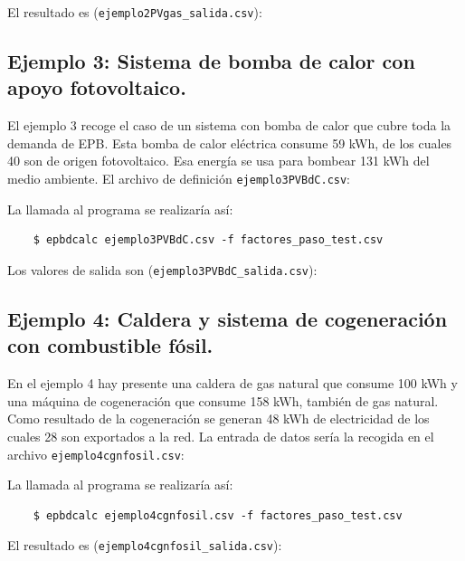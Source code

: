\documentclass[10pt,notitlepage,oneside,a4paper]{article}
\begin{document}
El resultado es (\texttt{ejemplo2PVgas\_salida.csv}):


\subsection{Ejemplo 3: Sistema de bomba de calor con apoyo fotovoltaico.}
El ejemplo 3 recoge el caso de un sistema con bomba de calor que cubre toda la demanda de EPB. Esta bomba de calor eléctrica consume 59 kWh, de los cuales 40 son de origen fotovoltaico. Esa energía se usa para bombear 131 kWh del medio ambiente. El archivo de definición \texttt{ejemplo3PVBdC.csv}:


La llamada al programa se realizaría así:

\begin{verbatim}
    $ epbdcalc ejemplo3PVBdC.csv -f factores_paso_test.csv
\end{verbatim}

Los valores de salida son (\texttt{ejemplo3PVBdC\_salida.csv}):


\subsection{Ejemplo 4: Caldera y sistema de cogeneración con combustible fósil.}
En el ejemplo 4 hay presente una caldera de gas natural que consume 100 kWh y una máquina de cogeneración que consume 158 kWh, también de gas natural. Como resultado de la cogeneración se generan 48 kWh de electricidad de los cuales 28 son exportados a la red. La entrada de datos sería la recogida en el archivo \texttt{ejemplo4cgnfosil.csv}:


La llamada al programa se realizaría así:

\begin{verbatim}
    $ epbdcalc ejemplo4cgnfosil.csv -f factores_paso_test.csv
\end{verbatim}

El resultado es (\texttt{ejemplo4cgnfosil\_salida.csv}):

\end{document}
